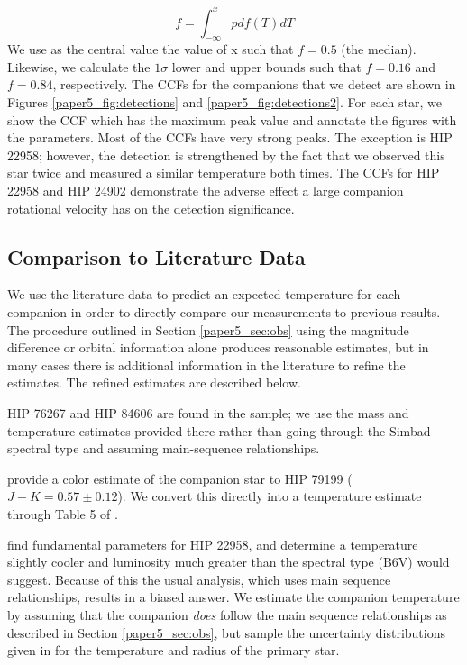 \begin{equation}
f = \int_{-\infty}^x {pdf(T)dT}
\end{equation}
We use as the central value the value of x such that $f=0.5$ (the median). Likewise, we calculate the $1 \sigma$ lower and upper bounds such that $f = 0.16$ and $f = 0.84$, respectively. The CCFs for the companions that we detect are shown in Figures \ref{paper5_fig:detections} and \ref{paper5_fig:detections2}. For each star, we show the CCF which has the maximum peak value and annotate the figures with the parameters. Most of the CCFs have very strong peaks. The exception is HIP 22958; however, the detection is strengthened by the fact that we observed this star twice and measured a similar temperature both times. The CCFs for HIP 22958 and HIP 24902 demonstrate the adverse effect a large companion rotational velocity has on the detection significance.

\subsection{Comparison to Literature Data}
\label{subpaper5_sec:expected_teffs}
We use the literature data to predict an expected temperature for each companion in order to directly compare our measurements to previous results. The procedure outlined in Section \ref{paper5_sec:obs} using the magnitude difference or orbital information alone produces reasonable estimates, but in many cases there is additional information in the literature to refine the estimates. The refined estimates are described below.

HIP 76267 and HIP 84606 are found in the \cite{David2015} sample; we use the mass and temperature estimates provided there rather than going through the Simbad spectral type and assuming main-sequence relationships.

\citet{Shatsky2002} provide a color estimate of the companion star to HIP 79199 ($J-K = 0.57 \pm 0.12$). We convert this directly into a temperature estimate through Table 5 of \citet{Pecaut2013}.

\citet{Zorec2012} find fundamental parameters for HIP 22958, and determine a temperature slightly cooler and luminosity much greater than the spectral type (B6V) would suggest. Because of this the usual analysis, which uses main sequence relationships, results in a biased answer. We estimate the companion temperature by assuming that the companion \emph{does} follow the main sequence relationships as described in Section \ref{paper5_sec:obs}, but sample the uncertainty distributions given in \citet{Zorec2012} for the temperature and radius of the primary star.


